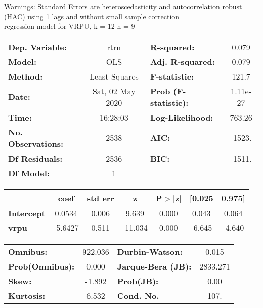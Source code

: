 Warnings: \newline
 [1] Standard Errors are heteroscedasticity and autocorrelation robust (HAC) using 1 lags and without small sample correction\\ 

regression model for VRPU, k = 12 h = 9\begin{center}
\begin{tabular}{lclc}
\toprule
\textbf{Dep. Variable:}    &       rtrn       & \textbf{  R-squared:         } &     0.079   \\
\textbf{Model:}            &       OLS        & \textbf{  Adj. R-squared:    } &     0.079   \\
\textbf{Method:}           &  Least Squares   & \textbf{  F-statistic:       } &     121.7   \\
\textbf{Date:}             & Sat, 02 May 2020 & \textbf{  Prob (F-statistic):} &  1.11e-27   \\
\textbf{Time:}             &     16:28:03     & \textbf{  Log-Likelihood:    } &    763.26   \\
\textbf{No. Observations:} &        2538      & \textbf{  AIC:               } &    -1523.   \\
\textbf{Df Residuals:}     &        2536      & \textbf{  BIC:               } &    -1511.   \\
\textbf{Df Model:}         &           1      & \textbf{                     } &             \\
\bottomrule
\end{tabular}
\begin{tabular}{lcccccc}
                   & \textbf{coef} & \textbf{std err} & \textbf{z} & \textbf{P$> |$z$|$} & \textbf{[0.025} & \textbf{0.975]}  \\
\midrule
\textbf{Intercept} &       0.0534  &        0.006     &     9.639  &         0.000        &        0.043    &        0.064     \\
\textbf{vrpu}      &      -5.6427  &        0.511     &   -11.034  &         0.000        &       -6.645    &       -4.640     \\
\bottomrule
\end{tabular}
\begin{tabular}{lclc}
\textbf{Omnibus:}       & 922.036 & \textbf{  Durbin-Watson:     } &    0.015  \\
\textbf{Prob(Omnibus):} &   0.000 & \textbf{  Jarque-Bera (JB):  } & 2833.271  \\
\textbf{Skew:}          &  -1.892 & \textbf{  Prob(JB):          } &     0.00  \\
\textbf{Kurtosis:}      &   6.532 & \textbf{  Cond. No.          } &     107.  \\
\bottomrule
\end{tabular}
\end{center}

